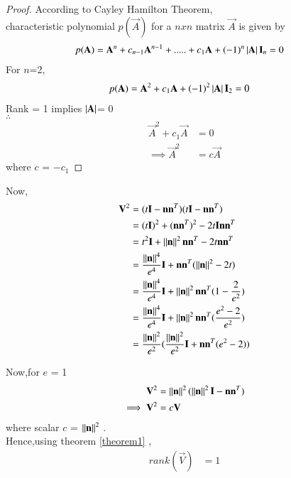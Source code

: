 \documentclass[journal,12pt,twocolumn]{IEEEtran}
\begin{document}
\begin{proof}
According to Cayley Hamilton Theorem,
\\
characteristic polynomial $p(\vec{A})$ for a  $nxn$ matrix $\vec{A}$ is given by
\begin{align}
    p(\mathbf{A}) &= \mathbf{A}^n + c_{n-1}\mathbf{A}^{n-1} + .....+ c_1\mathbf{A} + (-1)^n\left\vert\mathbf{A}\right\vert\mathbf{I}_n = 0
\end{align}
For $n$=2,
\begin{align}
    p(\mathbf{A}) &= \mathbf{A}^2 + c_1\mathbf{A} + (-1)^2\left\vert\mathbf{A}\right\vert\mathbf{I}_2=0
\end{align}
Rank = 1 implies $\left\vert\mathbf{A}\right\vert$= 0 
\\
$\therefore$
\begin{align}
    \vec{A}^2 + c_1\vec{A} &= 0
    \\
    \implies \vec{A}^2 &= c\vec{A}
\end{align}
where $c$ = $-c_1$
\end{proof}
Now,
\begin{align}
    \mathbf{V}^2 &= (t\mathbf{I}-\mathbf{n}\mathbf{n}^T)(t\mathbf{I}-\mathbf{n}\mathbf{n}^T) 
    \\
    &= (t\mathbf{I})^2 +(\mathbf{n}\mathbf{n}^T)^2 - 2t\mathbf{I}\mathbf{n}\mathbf{n}^T
    \\
    &= t^2\mathbf{I} + \left\lVert\mathbf{n}\right\rVert^2\mathbf{n}\mathbf{n}^T - 2t\mathbf{n}\mathbf{n}^T
    \\
    &= \frac{\left\lVert\mathbf{n}\right\rVert^4}{e^4}\mathbf{I} + \mathbf{n}\mathbf{n}^T(\left\lVert\mathbf{n}\right\rVert^2-2t)
    \\
    &= \frac{\left\lVert\mathbf{n}\right\rVert^4}{e^4}\mathbf{I} + \left\lVert\mathbf{n}\right\rVert^2\mathbf{n}\mathbf{n}^T(1-\frac{2}{e^2})
    \\
    &= \frac{\left\lVert\mathbf{n}\right\rVert^4}{e^4}\mathbf{I} + \left\lVert\mathbf{n}\right\rVert^2\mathbf{n}\mathbf{n}^T(\frac{e^2-2}{e^2})
    \\
    &= \frac{\left\lVert\mathbf{n}\right\rVert^2}{e^2}(\frac{\left\lVert\mathbf{n}\right\rVert^2}{e^2}\mathbf{I} + \mathbf{n}\mathbf{n}^T(e^2-2))
\end{align}

Now,for $e$ = 1
\begin{align}
    \mathbf{V}^2 &= \left\lVert\mathbf{n}\right\rVert^2(\left\lVert\mathbf{n}\right\rVert^2\mathbf{I} - \mathbf{n}\mathbf{n}^T)
    \\
    \implies \mathbf{V}^2 &= c\mathbf{V}
\end{align}
where scalar $c$ = $\left\lVert\mathbf{n}\right\rVert^2$ .
\\
Hence,using theorem \ref{theorem1} ,
\begin{align}
    rank(\vec{V}) &= 1
\end{align}
\end{document}
